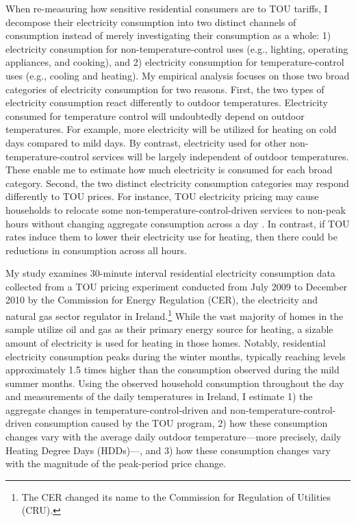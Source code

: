
When re-measuring how sensitive residential consumers are to TOU tariffs, I decompose their electricity consumption into two distinct channels of consumption instead of merely investigating their consumption as a whole: 1) electricity consumption for non-temperature-control uses (e.g., lighting, operating appliances, and cooking), and 2) electricity consumption for temperature-control uses (e.g., cooling and heating). My empirical analysis focuses on those two broad categories of electricity consumption for two reasons. First, the two types of electricity consumption react differently to outdoor temperatures. Electricity consumed for temperature control will undoubtedly depend on outdoor temperatures. For example, more electricity will be utilized for heating on cold days compared to mild days. By contrast, electricity used for other non-temperature-control services will be largely independent of outdoor temperatures. These enable me to estimate how much electricity is consumed for each broad category. Second, the two distinct electricity consumption categories may respond differently to TOU prices. For instance, TOU electricity pricing may cause households to relocate some non-temperature-control-driven services to non-peak hours without changing aggregate consumption across a day \citep{Residential-Response-to-Critical-Peak-Pricing-of-Electricity_California-Evidence_Herter-and-Wayland_2010, Empowering-Consumers-through-Data-and-Smart-Technology_HML_2016}. In contrast, if TOU rates induce them to lower their electricity use for heating, then there could be reductions in consumption across all hours. 

My study examines 30-minute interval residential electricity consumption data collected from a TOU pricing experiment conducted from July 2009 to December 2010 by the Commission for Energy Regulation (CER), the electricity and natural gas sector regulator in Ireland.\footnote{The CER changed its name to the Commission for Regulation of Utilities (CRU).} While the vast majority of homes in the sample utilize oil and gas as their primary energy source for heating, a sizable amount of electricity is used for heating in those homes. Notably, residential electricity consumption peaks during the winter months, typically reaching levels approximately 1.5 times higher than the consumption observed during the mild summer months. Using the observed household consumption throughout the day and measurements of the daily temperatures in Ireland, I estimate 1) the aggregate changes in temperature-control-driven and non-temperature-control-driven consumption caused by the TOU program, 2) how these consumption changes vary with the average daily outdoor temperature---more precisely, daily Heating Degree Days (HDDs)---, and 3) how these consumption changes vary with the magnitude of the peak-period price change.  

